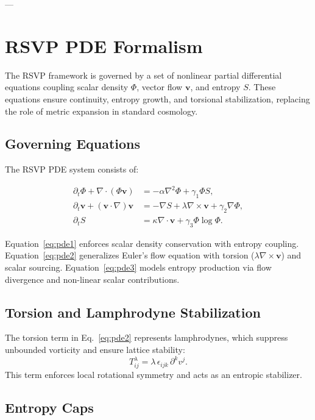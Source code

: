 \documentclass[12pt]{report}
\begin{document}
---

\chapter{RSVP PDE Formalism}

The RSVP framework is governed by a set of nonlinear partial differential equations coupling scalar density $\Phi$, vector flow $\mathbf{v}$, and entropy $S$. These equations ensure continuity, entropy growth, and torsional stabilization, replacing the role of metric expansion in standard cosmology.

\section{Governing Equations}

The RSVP PDE system consists of:

\begin{align}
\partial_t \Phi + \nabla \cdot (\Phi \mathbf{v}) &= -\alpha \nabla^2 \Phi + \gamma_1 \Phi S, 
\label{eq:pde1}\\
\partial_t \mathbf{v} + (\mathbf{v}\cdot\nabla)\mathbf{v} &= -\nabla S + \lambda \nabla \times \mathbf{v} + \gamma_2 \nabla \Phi,
\label{eq:pde2}\\
\partial_t S &= \kappa \nabla \cdot \mathbf{v} + \gamma_3 \Phi \log \Phi.
\label{eq:pde3}
\end{align}

Equation~\eqref{eq:pde1} enforces scalar density conservation with entropy coupling.  
Equation~\eqref{eq:pde2} generalizes Euler’s flow equation with torsion ($\lambda \nabla \times \mathbf{v}$) and scalar sourcing.  
Equation~\eqref{eq:pde3} models entropy production via flow divergence and non-linear scalar contributions.

\section{Torsion and Lamphrodyne Stabilization}

The torsion term in Eq.~\eqref{eq:pde2} represents lamphrodynes, which suppress unbounded vorticity and ensure lattice stability:
\begin{equation}
T_{ij}^\lambda = \lambda \, \epsilon_{ijk} \, \partial^k v^j.
\end{equation}
This term enforces local rotational symmetry and acts as an entropic stabilizer.

\section{Entropy Caps}
\end{document}
